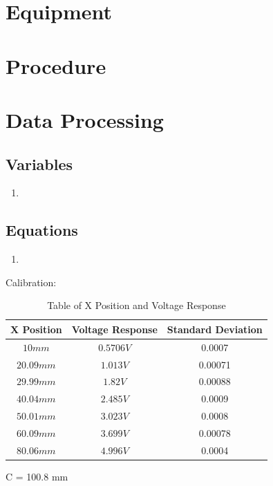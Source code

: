 \documentclass{article}
\begin{document}
\section{Equipment}


\section{Procedure}

\section{Data Processing}
\subsection*{Variables}
\begin{enumerate}[label = \roman*.]
    \item
\end{enumerate}

\subsection*{Equations}
\begin{enumerate}[label = \Roman*.]
    \item 
\end{enumerate} 

Calibration:
\begin{table}[ht]
\centering
\begin{tabular}{|c|c|c|}
\hline
\textbf{X Position} & \textbf{Voltage Response} & \textbf{Standard Deviation} \\
\hline
$10 mm$ & $0.5706 V$ & 0.0007\\
\hline
$20.09 mm$ & $1.013 V$ & 0.00071 \\
\hline
$29.99 mm$ & $1.82 V$ & 0.00088 \\
\hline
$40.04 mm$ & $2.485 V$ & 0.0009\\
\hline
$50.01 mm$ & $3.023 V$ & 0.0008\\
\hline
$60.09 mm$ & $3.699 V$ & 0.00078\\
\hline
$80.06 mm$ & $4.996 V$ & 0.0004\\
\hline
\end{tabular}
\caption{Table of X Position and Voltage Response}
\label{tab:position_voltage}
\end{table}

C = 100.8 mm
\end{document}
